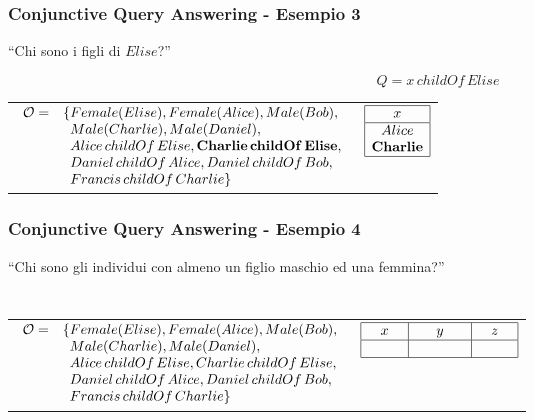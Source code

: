\documentclass[8pt]{beamer}
\begin{document}
\begin{frame}
\frametitle{Conjunctive Query Answering - Esempio 3}
\begin{center}
``Chi sono i figli di $Elise$?''
\end{center}
\[
 Q=x\,childOf\,Elise
\]
\vspace{\baselineskip}

\begin{tabular}{lc}
$\begin{array}{cl}
  \Ont  =  &  \{Female(Elise),  Female(Alice), Male(Bob), \\
  &\phantom{\{}Male(Charlie), Male(Daniel), \\
  &\phantom{\{}Alice\,childOf\,Elise, \mathbf{Charlie\,childOf\,Elise}, \\
  &\phantom{\{}Daniel\,childOf\,Alice, Daniel\,childOf\,Bob, \\
  &\phantom{\{}Francis\,childOf\,Charlie \}\\
\end{array}$ & 
$\begin{array}{|c|}
  \hline
  x\\
  \hline
  Alice\\
  \mathbf{Charlie}\\
  \hline
\end{array}$ \\
\end{tabular}
\end{frame}

\begin{frame}
\frametitle{Conjunctive Query Answering - Esempio 4}
\begin{center}
``Chi sono gli individui con almeno un figlio maschio ed una femmina?''
\end{center}
\[
 \phantom{Q=y\,childOf\,x\,\wedge\,z\,childOf\,x\,\wedge\,Male(y)\,\wedge\,Female(z)}
\]
\vspace{\baselineskip}

\begin{tabular}{lc}
$\begin{array}{cl}
  \Ont  =  &  \{Female(Elise),  Female(Alice), Male(Bob), \\
  &\phantom{\{}Male(Charlie), Male(Daniel), \\
  &\phantom{\{}Alice\,childOf\,Elise, Charlie\,childOf\,Elise, \\
  &\phantom{\{}Daniel\,childOf\,Alice, Daniel\,childOf\,Bob, \\
  &\phantom{\{}Francis\,childOf\,Charlie \}\\
\end{array}$ & 
$\begin{array}{|c|c|c|}
  \hline
  x&y&z\\
  \hline
  \phantom{Elise}&\phantom{Charlie}&\phantom{Alice}\\
  \hline
\end{array}$ \\
\end{tabular}
\end{frame}
\end{document}
